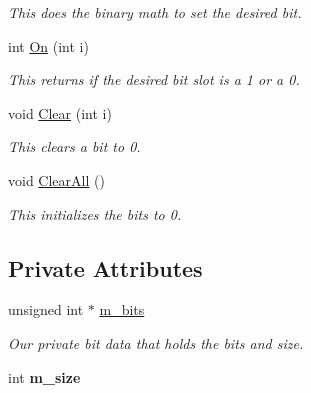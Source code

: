 \begin{DoxyCompactItemize}
\begin{DoxyCompactList}\small\item\em This does the binary math to set the desired bit. \end{DoxyCompactList}\item 
int \hyperlink{class_c_bitset_a57dfc60d4a180f8166e94bd41612d3f8}{On} (int i)\hypertarget{class_c_bitset_a57dfc60d4a180f8166e94bd41612d3f8}{}\label{class_c_bitset_a57dfc60d4a180f8166e94bd41612d3f8}

\begin{DoxyCompactList}\small\item\em This returns if the desired bit slot is a 1 or a 0. \end{DoxyCompactList}\item 
void \hyperlink{class_c_bitset_a0278f6027f4bbc3177731ccadb638e2a}{Clear} (int i)\hypertarget{class_c_bitset_a0278f6027f4bbc3177731ccadb638e2a}{}\label{class_c_bitset_a0278f6027f4bbc3177731ccadb638e2a}

\begin{DoxyCompactList}\small\item\em This clears a bit to 0. \end{DoxyCompactList}\item 
void \hyperlink{class_c_bitset_ad1cf97399375c29574079338ce02d7ac}{Clear\+All} ()\hypertarget{class_c_bitset_ad1cf97399375c29574079338ce02d7ac}{}\label{class_c_bitset_ad1cf97399375c29574079338ce02d7ac}

\begin{DoxyCompactList}\small\item\em This initializes the bits to 0. \end{DoxyCompactList}\end{DoxyCompactItemize}
\subsection*{Private Attributes}
\begin{DoxyCompactItemize}
\item 
unsigned int $\ast$ \hyperlink{class_c_bitset_ad652e9601865e54acd0d956b1493a535}{m\+\_\+bits}\hypertarget{class_c_bitset_ad652e9601865e54acd0d956b1493a535}{}\label{class_c_bitset_ad652e9601865e54acd0d956b1493a535}

\begin{DoxyCompactList}\small\item\em Our private bit data that holds the bits and size. \end{DoxyCompactList}\item 
int {\bfseries m\+\_\+size}\hypertarget{class_c_bitset_ab55d8030981a04787e0198a124fa8488}{}\label{class_c_bitset_ab55d8030981a04787e0198a124fa8488}

\end{DoxyCompactItemize}


